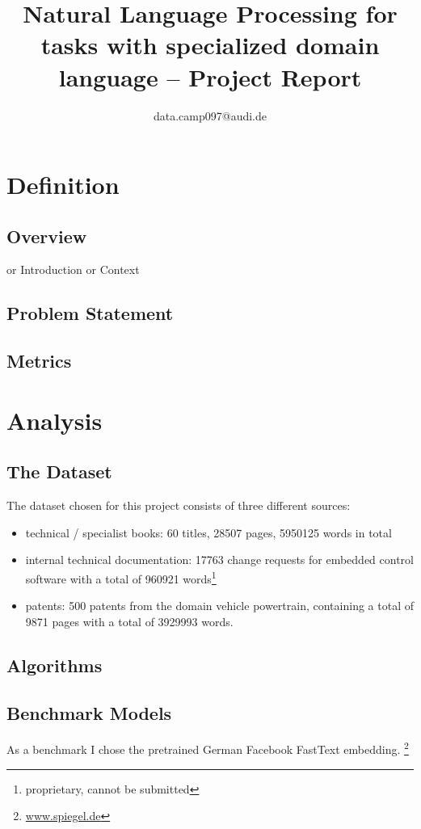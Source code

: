 \documentclass[10pt,a4paper]{article}
\begin{document}
	\title{Natural Language Processing for tasks with specialized domain language  --  Project Report}
	\author{data.camp097@audi.de}
	\maketitle
	
	\section{Definition}
	\subsection{Overview}
	or Introduction or Context
	\subsection{Problem Statement}
	
	\subsection{Metrics}
	\section{Analysis}
	\subsection{The Dataset}
	The dataset chosen for this project consists of three different sources:
		\begin{itemize}
		\item technical / specialist books: 60 titles, 28507 pages, 5950125 words in total 
		\item internal technical documentation: 17763 change requests for embedded control software with a total of 960921 words\footnote{proprietary, cannot be submitted} 
		\item patents: 500 patents from the domain vehicle powertrain, containing a total of 9871 pages with a total of 3929993 words.
	\end{itemize}
    \subsection{Algorithms}
    \subsection{Benchmark Models}
    As a benchmark I chose the pretrained German Facebook FastText embedding. \footnote{\url{www.spiegel.de}}
\end{document}
